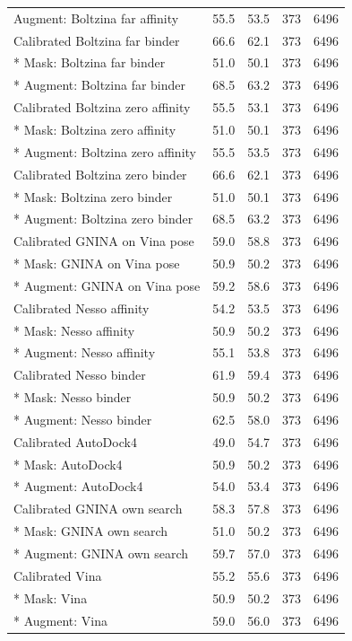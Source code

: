 \documentclass[pdflatex,sn-nature]{sn-jnl}
\begin{document}
\begin{longtable}{lrrrr}
Augment: Boltzina far affinity & 55.5 & 53.5 & 373 & 6496\\
Calibrated Boltzina far binder & 66.6 & 62.1 & 373 & 6496\\*
Mask: Boltzina far binder & 51.0 & 50.1 & 373 & 6496\\*
Augment: Boltzina far binder & 68.5 & 63.2 & 373 & 6496\\
Calibrated Boltzina zero affinity & 55.5 & 53.1 & 373 & 6496\\*
Mask: Boltzina zero affinity & 51.0 & 50.1 & 373 & 6496\\*
Augment: Boltzina zero affinity & 55.5 & 53.5 & 373 & 6496\\
Calibrated Boltzina zero binder & 66.6 & 62.1 & 373 & 6496\\*
Mask: Boltzina zero binder & 51.0 & 50.1 & 373 & 6496\\*
Augment: Boltzina zero binder & 68.5 & 63.2 & 373 & 6496\\
Calibrated GNINA on Vina pose & 59.0 & 58.8 & 373 & 6496\\*
Mask: GNINA on Vina pose & 50.9 & 50.2 & 373 & 6496\\*
Augment: GNINA on Vina pose & 59.2 & 58.6 & 373 & 6496\\
Calibrated Nesso affinity & 54.2 & 53.5 & 373 & 6496\\*
Mask: Nesso affinity & 50.9 & 50.2 & 373 & 6496\\*
Augment: Nesso affinity & 55.1 & 53.8 & 373 & 6496\\
Calibrated Nesso binder & 61.9 & 59.4 & 373 & 6496\\*
Mask: Nesso binder & 50.9 & 50.2 & 373 & 6496\\*
Augment: Nesso binder & 62.5 & 58.0 & 373 & 6496\\
Calibrated AutoDock4 & 49.0 & 54.7 & 373 & 6496\\*
Mask: AutoDock4 & 50.9 & 50.2 & 373 & 6496\\*
Augment: AutoDock4 & 54.0 & 53.4 & 373 & 6496\\
Calibrated GNINA own search & 58.3 & 57.8 & 373 & 6496\\*
Mask: GNINA own search & 51.0 & 50.2 & 373 & 6496\\*
Augment: GNINA own search & 59.7 & 57.0 & 373 & 6496\\
Calibrated Vina & 55.2 & 55.6 & 373 & 6496\\*
Mask: Vina & 50.9 & 50.2 & 373 & 6496\\*
Augment: Vina & 59.0 & 56.0 & 373 & 6496\\
\bottomrule
\end{longtable}
\normalsize
\end{document}
